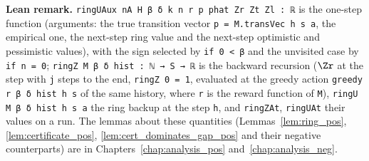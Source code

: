 \textbf{Lean remark.} \texttt{ringUAux nA H β δ k n r p phat Zr Zt Zl : ℝ} is the one-step
function (arguments: the true transition vector \texttt{p = M.transVec h s a}, the empirical
one, the next-step ring value and the next-step optimistic and pessimistic values), with the
sign selected by \texttt{if 0 < β} and the unvisited case by \texttt{if n = 0};
\texttt{ringZ M β δ hist : ℕ → S → ℝ} is the backward recursion ($\Zr$ at the step with
\texttt{j} steps to the end, \texttt{ringZ 0 = 1}, evaluated at the greedy action
\texttt{greedy r β δ hist h s} of the same history, where \texttt{r} is the reward function of
\texttt{M}), \texttt{ringU M β δ hist h s a} the ring backup at the step \texttt{h}, and
\texttt{ringZAt}, \texttt{ringUAt} their values on a run. The lemmas about these quantities
(Lemmas~\ref{lem:ring_pos}, \ref{lem:certificate_pos}, \ref{lem:cert_dominates_gap_pos} and
their negative counterparts) are in Chapters~\ref{chap:analysis_pos} and~\ref{chap:analysis_neg}.
